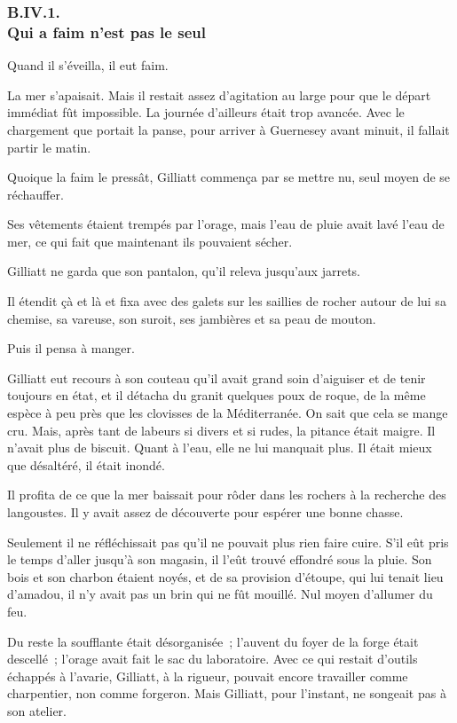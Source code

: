 \documentclass[french,twoside]{book} %
\begin{document}
  \subsubsection[{B.IV.1. Qui a faim n’est pas le seul}]{B.IV.1. \\
Qui a faim n’est pas le seul}
\noindent Quand il s’éveilla, il eut faim.\par
La mer s’apaisait. Mais il restait assez d’agitation au large pour que le départ immédiat fût impossible. La journée d’ailleurs était trop avancée. Avec le chargement que portait la panse, pour arriver à Guernesey avant minuit, il fallait partir le matin.\par
Quoique la faim le pressât, Gilliatt commença par se mettre nu, seul moyen de se réchauffer.\par
Ses vêtements étaient trempés par l’orage, mais l’eau de pluie avait lavé l’eau de mer, ce qui fait que maintenant ils pouvaient sécher.\par
Gilliatt ne garda que son pantalon, qu’il releva jusqu’aux jarrets.\par
Il étendit çà et là et fixa avec des galets sur les saillies de rocher autour de lui sa chemise, sa vareuse, son suroit, ses jambières et sa peau de mouton.\par
 Puis il pensa à manger.\par
Gilliatt eut recours à son couteau qu’il avait grand soin d’aiguiser et de tenir toujours en état, et il détacha du granit quelques poux de roque, de la même espèce à peu près que les clovisses de la Méditerranée. On sait que cela se mange cru. Mais, après tant de labeurs si divers et si rudes, la pitance était maigre. Il n’avait plus de biscuit. Quant à l’eau, elle ne lui manquait plus. Il était mieux que désaltéré, il était inondé.\par
Il profita de ce que la mer baissait pour rôder dans les rochers à la recherche des langoustes. Il y avait assez de découverte pour espérer une bonne chasse.\par
Seulement il ne réfléchissait pas qu’il ne pouvait plus rien faire cuire. S’il eût pris le temps d’aller jusqu’à son magasin, il l’eût trouvé effondré sous la pluie. Son bois et son charbon étaient noyés, et de sa provision d’étoupe, qui lui tenait lieu d’amadou, il n’y avait pas un brin qui ne fût mouillé. Nul moyen d’allumer du feu.\par
Du reste la soufflante était désorganisée ; l’auvent du foyer de la forge était descellé ; l’orage avait fait le sac du laboratoire. Avec ce qui restait d’outils échappés à l’avarie, Gilliatt, à la rigueur, pouvait encore travailler comme charpentier, non comme forgeron. Mais Gilliatt, pour l’instant, ne songeait pas à son atelier.\par
\end{document}
